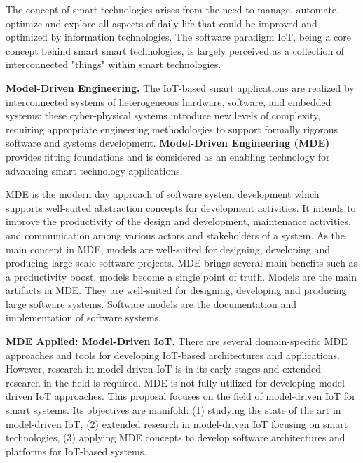 \documentclass[10pt, oneside]{article}
\begin{document}
The concept of smart technologies arises from the need to manage, automate, optimize and explore all aspects of daily life that could be improved and optimized by information technologies. The software paradigm IoT, being a core concept behind smart smart technologies, is largely perceived as a collection of interconnected "things" within smart technologies.

\textbf{Model-Driven Engineering.} The IoT-based smart applications are realized by interconnected systems of heterogeneous hardware, software, and embedded systems: these cyber-physical systems introduce new levels of complexity, requiring appropriate engineering methodologies to support formally rigorous software and systems development. \textbf{Model-Driven Engineering (MDE)} provides fitting foundations and is considered as an enabling technology for advancing smart technology applications.

MDE is the modern day approach of software system development which supports well-suited abstraction concepts for development activities. It intends to improve the productivity of the design and development, maintenance activities, and communication among various actors and stakeholders of a system. As the main concept in MDE, models are well-suited for designing, developing and producing large-scale software projects. MDE brings several main benefits such as a productivity boost, models become a single point of truth. Models are the main artifacts in MDE. They are well-suited for designing, developing and producing large software systems. Software models are the documentation and implementation of software systems.

\textbf{MDE Applied: Model-Driven IoT.} There are several domain-specific MDE approaches and tools for developing IoT-based architectures and applications. However, research in model-driven IoT is in its early stages and extended research in the field is required. MDE is not fully utilized for developing model-driven IoT approaches. This proposal focuses on the field of model-driven IoT for smart systems. Its objectives are manifold: (1) studying the state of the art in model-driven IoT, (2) extended research in model-driven IoT focusing on smart technologies, (3) applying MDE concepts to develop software architectures and platforms for IoT-based systems.
\end{document}
